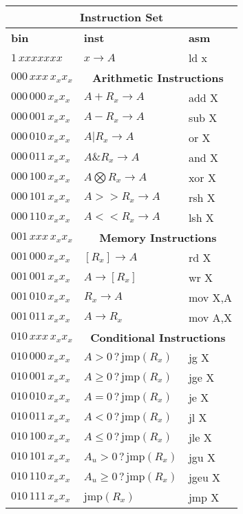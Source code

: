 \documentclass[11pt]{article}
\begin{document}
\begin{tabular}{|l | l | l |}
\hline
\multicolumn{3}{|c|}{ \textbf{Instruction Set}} \\
\hline
\textbf{bin} & \textbf{inst} & \textbf{asm}\\
\hline 
$1\,xxxxxxx$ & $x \rightarrow A$ & ld x  \\
\hline
$000\,xxx\,x_x x_x$&\multicolumn{2}{c|}{ \textbf{Arithmetic Instructions}} \\
\hline
$000\,000\,x_x x_x$ & $A + R_x \rightarrow A$ & add X \\
$000\,001\,x_x x_x$ & $A - R_x \rightarrow A$ & sub X \\
$000\,010\,x_x x_x$ & $A | R_x \rightarrow A$ & or X \\
$000\,011\, x_x x_x$ & $A \& R_x \rightarrow A$ & and X \\
$000\,100\, x_x x_x$ & $A \bigotimes R_x \rightarrow A$ & xor X \\
$000\,101\, x_x x_x$ & $A >> R_x \rightarrow A$ & rsh X \\
$000\,110\, x_x x_x$ & $A << R_x \rightarrow A$ & lsh X \\
\hline
$001\,xxx\,x_x x_x$&\multicolumn{2}{c|}{ \textbf{Memory Instructions}} \\
\hline
$001\,000\, x_x x_x$ & $[R_x] \rightarrow A$ & rd X \\
$001\,001\, x_x x_x$ & $A \rightarrow [R_x]$ & wr X \\
$001\,010\, x_x x_x$ & $R_x \rightarrow A$ & mov X,A \\
$001\,011\, x_x x_x$ & $A \rightarrow R_x$ & mov A,X \\
\hline
$010\,xxx\,x_x x_x$&\multicolumn{2}{c|}{ \textbf{Conditional Instructions}} \\
\hline
$010\,000\, x_x x_x$ & $A > 0 \,?\, \mathrm{jmp}(R_x)$ & jg X \\
$010\,001\, x_x x_x$ & $A \geq 0 \,?\, \mathrm{jmp}(R_x)$ & jge X \\
$010\,010\, x_x x_x$ & $A = 0 \,?\, \mathrm{jmp}(R_x)$ & je X \\
$010\,011\, x_x x_x$ & $A < 0 \,?\, \mathrm{jmp}(R_x)$ & jl X \\
$010\,100\, x_x x_x$ & $A \leq 0 \,?\, \mathrm{jmp}(R_x)$ & jle X \\
$010\,101\, x_x x_x$ & $A_u > 0 \,?\, \mathrm{jmp}(R_x)$ & jgu X \\
$010\,110\, x_x x_x$ & $A_u \geq 0 \,?\, \mathrm{jmp}(R_x)$ & jgeu X \\
$010\,111\, x_x x_x$ & $\mathrm{jmp}(R_x)$ & jmp X \\
\hline
\end{tabular}
\end{document}
